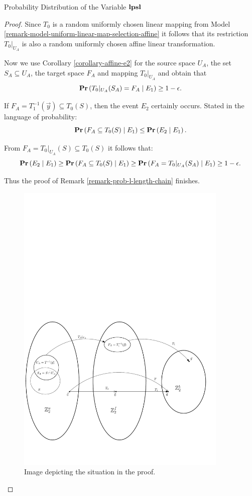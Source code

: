 \begin{section}{Probability Distribution of the Variable \texorpdfstring{$\mathbf{lpsl}$}{lpsl}}
\begin{proof}
Since $T_0$ is a random uniformly chosen linear mapping from Model \ref{remark-model-uniform-linear-map-selection-affine} it follows that its restriction $T_0|_{U_A}$ is also a random uniformly chosen affine linear transformation.

Now we use Corollary \ref{corollary-affine-e2} for the source space $U_A$, the set $S_A \subseteq U_A$, the target space $F_A$ and mapping $T_0|_{U_A}$ and obtain that 
\[
	\mathbf{Pr}\left(T_0|_{U_A}(S_A) = F_A \mid E_1\right) \geq 1 - \epsilon \text{.}
\]

If $F_A = T_1^{-1}(\vec{y}) \subseteq T_0(S)$, then the event $E_2$ certainly occurs. Stated in the language of probability:
\[
	\mathbf{Pr}\left(F_A \subseteq T_0(S) \mid E_1\right) \leq \mathbf{Pr}\left(E_2 \mid E_1\right) \text{.}
\]

From $F_A = T_0|_{U_A}(S) \subseteq T_0(S)$ it follows that:
\[
	\mathbf{Pr}\left(E_2 \mid E_1\right) \geq \mathbf{Pr}\left(F_A \subseteq T_0(S) \mid E_1\right) \geq \mathbf{Pr}\left(F_A = T_0|_{U_A}(S_A) \mid E_1\right) \geq 1 - \epsilon \text{.}
\]

Thus the proof of Remark \ref{remark-prob-l-length-chain} finishes.

\begin{figure}
  \centering
    \includegraphics[width=0.9\textwidth]{images/elpsl_proof}
  \caption{Image depicting the situation in the proof.}
\end{figure}


\end{proof}
\end{section}
